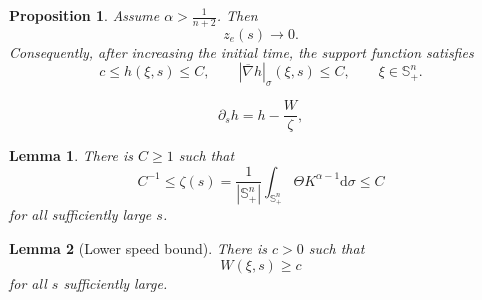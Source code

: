 \documentclass[10pt,a4paper]{amsart}
\newtheorem{proposition}{Proposition}
\newtheorem{lemma}{Lemma}
\begin{document}
\begin{proposition}
	\label{thm:C0-alpha}
	Assume $\alpha>\frac{1}{n+2}$. Then
	\begin{equation}
    \label{eq:entropy-point-to-zero}
		z_e(s)\longrightarrow 0.
	\end{equation}
	Consequently, after increasing the initial time, the support function satisfies
	\begin{equation}\label{eq:subunit-origin-C0}
		c\le h(\xi,s)\le C,\qquad |\overline{\nabla}h|_{\sigma}(\xi,s)\leq C,
		\qquad \xi\in\mathbb{S}^n_+.
	\end{equation}
\end{proposition}

\begin{equation}\label{eq:F-shifted}
    \partial_s h=h-\frac{W}{\zeta},
\end{equation}

\begin{lemma}\label{lem:Lambda-bounds-alpha}
There is $C\ge1$ such that
\begin{equation}\label{eq:Lambda-bounds-alpha}
        C^{-1}\le \zeta(s)= \dfrac{1}{|\mathbb{S}_+^n|}\int_{\mathbb{S}_+^n} \Theta K^{\alpha-1}\mathrm{d}\sigma  \le C
\end{equation}
for all sufficiently large $s$.
\end{lemma}

\begin{lemma}[Lower speed bound]\label{prop:F-lower-alpha}
There is $c>0$ such that
\begin{equation}\label{eq:F-lower-alpha}
       W(\xi,s)\ge c
\end{equation}
for all $s$ sufficiently large.
\end{lemma}
\end{document}
